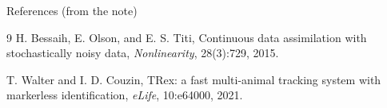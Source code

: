 \documentclass[aspectratio=169]{beamer}
\begin{document}
\begin{frame}{References (from the note)}
\small
\begin{thebibliography}{9}
H. Bessaih, E. Olson, and E. S. Titi,
\newblock Continuous data assimilation with stochastically noisy data,
\newblock \emph{Nonlinearity}, 28(3):729, 2015.

T. Walter and I. D. Couzin,
\newblock TRex: a fast multi-animal tracking system with markerless identification,
\newblock \emph{eLife}, 10:e64000, 2021.
\end{thebibliography}
\end{frame}
\end{document}
